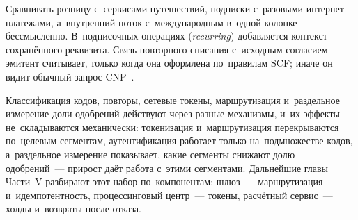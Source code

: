 Сравнивать розницу с~сервисами путешествий, подписки с~разовыми
интернет-платежами, а~внутренний поток с~международным в~одной колонке
бессмысленно. В~подписочных операциях (\textit{recurring}) добавляется контекст
сохранённого реквизита. Связь повторного списания с~исходным согласием
эмитент считывает, только когда она оформлена по~правилам SCF; иначе он видит
обычный запрос CNP~\cite{visa-scf,mc-tpr}.

Классификация кодов, повторы, сетевые токены, маршрутизация и~раздельное
измерение доли одобрений действуют через разные механизмы, и~их эффекты
не~складываются механически: токенизация и~маршрутизация перекрываются
по~целевым сегментам, аутентификация работает только на~подмножестве кодов,
а~раздельное измерение показывает, какие сегменты снижают долю одобрений~---
прирост даёт работа с~этими сегментами. Дальнейшие главы Части~V
разбирают этот набор по~компонентам: шлюз~--- маршрутизация
и~идемпотентность, процессинговый центр~--- токены, расчётный сервис~--- холды
и~возвраты после отказа.

